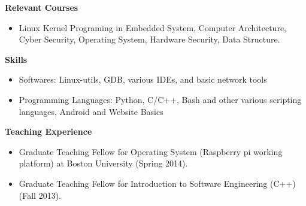 \documentclass[]{article}
\begin{document}
\noindent \textbf{Relevant Courses}
\begin{itemize}
\item 
Linux Kernel Programing in Embedded System, Computer Architecture, Cyber
Security, Operating System, Hardware Security, Data Structure.
\end{itemize}


\noindent \textbf{Skills}
\begin{itemize}
\item Softwares: Linux-utils, GDB, various IDEs, and basic network tools
\item Programming Languages:  Python, C/C++, Bash and other various scripting languages,
Android and Website Basics
\end{itemize}
\noindent \textbf{Teaching Experience}
\begin{itemize}
\item Graduate Teaching Fellow for Operating System (Raspberry pi working
platform) at Boston University (Spring 2014).
\item Graduate Teaching Fellow for Introduction to Software Engineering (C++)
(Fall 2013).
\end{itemize}
\end{document}
